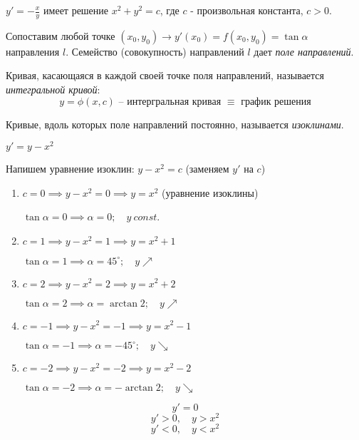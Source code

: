 \begin{example}
    $y' = - \frac{x}{y}$ имеет решение $x^2 + y^2 = c$, где $c$ - произвольная константа, $c > 0$.
\end{example}

\begin{definition}
    Сопоставим любой точке $(x_0,y_0) \rightarrow y'(x_0) = f(x_0,y_0) = \tan\alpha$ направления $l$. Семейство (совокупность) направлений $l$ дает \emph{поле направлений}.
\end{definition}

\begin{definition}
    Кривая, касающаяся в каждой своей точке поля направлений, называется \emph{интегральной кривой}:
    \[
        y = \phi(x,c)\text{ -- интергральная кривая }\equiv\text{ график решения}
    \]
\end{definition}

\begin{definition}[Изоклины]
    Кривые, вдоль которых поле направлений постоянно, называется \emph{изоклинами}.
\end{definition}

\begin{example}
    $y' = y-x^2$

    Напишем уравнение изоклин: $y-x^2 = c$ (заменяем $y'$ на $c$)
    \begin{enumerate}
        \item $c=0 \implies y-x^2 = 0 \implies y=x^2$ (уравнение изоклины)

              $\tan \alpha = 0 \implies \alpha = 0; \quad y \ const$.
        \item $c=1 \implies y-x^2 = 1 \implies y=x^2 + 1$

              $\tan \alpha = 1 \implies \alpha = 45^{\circ}; \quad y\nearrow$
        \item $c=2 \implies y-x^2 = 2 \implies y=x^2 + 2$

              $\tan \alpha = 2 \implies \alpha = \arctan 2; \quad y\nearrow$
        \item $c=-1 \implies y-x^2 = -1 \implies y=x^2 - 1$

              $\tan \alpha = -1 \implies \alpha = -45^{\circ}; \quad y\searrow$
        \item $c=-2 \implies y-x^2 = -2 \implies y=x^2 - 2$

              $\tan \alpha = -2 \implies \alpha = -\arctan 2; \quad y\searrow$
    \end{enumerate}
    \[
        y' = 0
    \]
    \[
        y' > 0, \quad y > x^2
    \]
    \[
        y' < 0, \quad y < x^2
    \]
\end{example}

